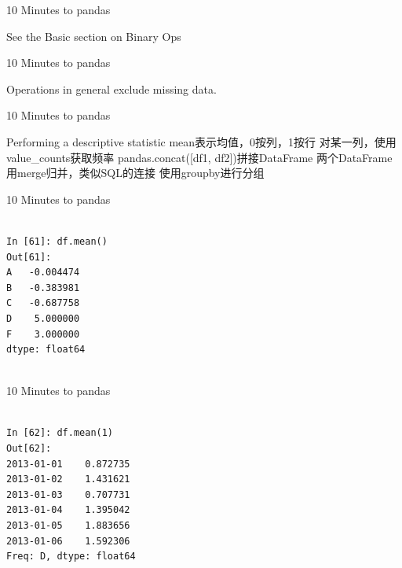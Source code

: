 \documentclass{beamer}
\begin{document}
\begin{frame}[t]{10 Minutes to pandas}

See the Basic section on Binary Ops

\end{frame}


\begin{frame}[t]{10 Minutes to pandas}

Operations in general exclude missing data.

\end{frame}


\begin{frame}[t]{10 Minutes to pandas}

Performing a descriptive statistic
mean表示均值，0按列，1按行
对某一列，使用value\_counts获取频率
pandas.concat([df1, df2])拼接DataFrame
两个DataFrame用merge归并，类似SQL的连接
使用groupby进行分组

\end{frame}


\begin{frame}[t,fragile]{10 Minutes to pandas}


	\scriptsize
\begin{verbatim}

In [61]: df.mean()
Out[61]: 
A   -0.004474
B   -0.383981
C   -0.687758
D    5.000000
F    3.000000
dtype: float64


\end{verbatim}


\end{frame}




\begin{frame}[t,fragile]{10 Minutes to pandas}


	\scriptsize
\begin{verbatim}

In [62]: df.mean(1)
Out[62]: 
2013-01-01    0.872735
2013-01-02    1.431621
2013-01-03    0.707731
2013-01-04    1.395042
2013-01-05    1.883656
2013-01-06    1.592306
Freq: D, dtype: float64


\end{verbatim}


\end{frame}
\end{document}
